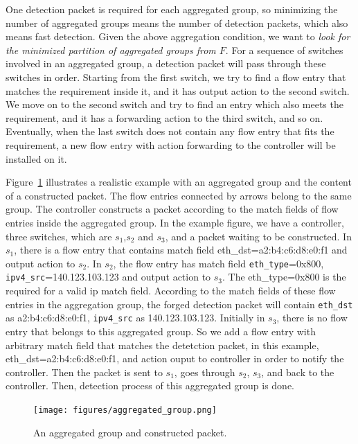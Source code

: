 One detection packet is required for each aggregated group, so minimizing the number of aggregated groups means the number of detection packets, which also means fast detection. Given the above aggregation condition, we want to \textit{look for the minimized partition of aggregated groups from $F$}. For a sequence of switches involved in an aggregated group, a detection packet will pass through these switches in order. Starting from the first switch, we try to find a flow entry that matches the requirement inside it, and it has output action to the second switch. We move on to the second switch and try to find an entry which also meets the requirement, and it has a forwarding action to the third switch, and so on. Eventually, when the last switch does not contain any flow entry that fits the requirement, a new flow entry with action forwarding to the controller will be installed on it.

Figure~\ref{aggregated_group} illustrates a realistic example with an aggregated group and the content of a constructed packet. The flow entries connected by arrows belong to the same group. The controller constructs a packet according to the match fields of flow entries inside the aggregated group. In the example figure, we have a controller, three switches, which are $s_1$,$s_2$ and $s_3$, and a packet waiting to be constructed. In $s_1$, there is a flow entry that contains match field eth\_dst=a2:b4:c6:d8:e0:f1 and output action to $s_2$. In $s_2$, the flow entry has match field \texttt{eth\_type}=0x800, \texttt{ipv4\_src}=140.123.103.123 and output action to $s_3$. The eth\_type=0x800 is the required for a valid ip match field. According to the match fields of these flow entries in the aggregation group, the forged detection packet will contain \texttt{eth\_dst} as a2:b4:c6:d8:e0:f1, \texttt{ipv4\_src} as 140.123.103.123. Initially in $s_3$, there is no flow entry that belongs to this aggregated group. So we add a flow entry with arbitrary match field that matches the detetction packet, in this example, eth\_dst=a2:b4:c6:d8:e0:f1, and action ouput to controller in order to notify the controller. Then the packet is sent to $s_1$, goes through $s_2$, $s_3$, and back to the controller. Then, detection process of this aggregated group is done.

\begin{figure}[H]
\begin{center}
\texttt{[image: figures/aggregated\_group.png]}
\end{center}
\caption{An aggregated group and constructed packet.}
\label{aggregated_group}
\end{figure}

